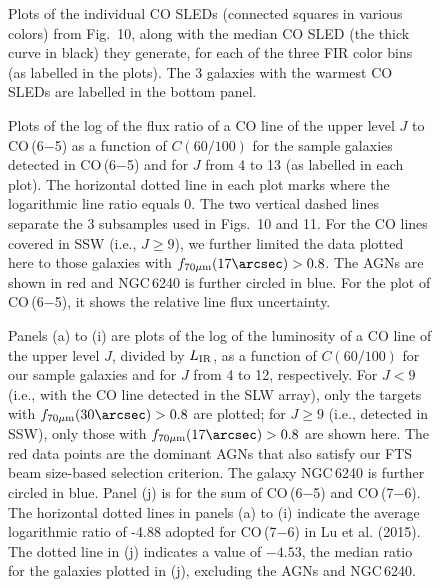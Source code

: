 \documentclass[preprint]{aastex}
\newcommand{\LIR}{\mbox{$L_{\rm IR}$}}
\begin{document}
\begin{figure}
\centering
\caption{
Plots of the individual CO SLEDs (connected squares in various colors) from Fig.~10, along 
with the median CO SLED (the thick curve in black) they generate, for each of the three 
FIR color bins (as labelled in the plots).  The 3 galaxies with the warmest CO SLEDs are 
labelled in the bottom panel.
}
\label{Fig11}
\end{figure}
\clearpage



\begin{figure}
\centering
{}
\caption{
Plots of the log of the flux ratio of a CO line of the upper level $J$ to CO\,(6$-$5) as a function
of $C(60/100)$ for the sample galaxies detected in CO\,(6$-$5) and for $J$ from 4 to 13 (as labelled 
in each plot).   The horizontal dotted line in each plot marks where the logarithmic line 
ratio equals 0. The two vertical dashed lines separate the 3 subsamples used in Figs.~10 and
11.  For the CO lines covered in SSW (i.e., $J \geqslant 9$), we further limited the data 
plotted here to those galaxies with $f_{70\mu{\rm m}}(17\arcsec) > 0.8$.  The AGNs are 
shown in red and NGC\,6240 is further circled in blue. For the plot of CO\,(6$-$5), it shows 
the relative line flux uncertainty.
}
\label{Fig12}
\end{figure}
\clearpage



\begin{figure}
\centering
{}
\caption{
Panels (a) to (i) are plots of the log of the luminosity of a CO line of the upper level $J$, 
divided by \LIR, as a function of $C(60/100)$ for our sample galaxies and for $J$ from 4 to
12, respectively.  For $J < 9$ (i.e., with the CO line detected in the SLW array), 
only the targets  with $f_{70\mu{\rm m}}(30\arcsec) > 0.8$ are plotted; for $J \geqslant 9$ 
(i.e., detected in SSW), only those with $f_{70\mu{\rm m}}(17\arcsec) > 0.8$ are shown here. 
The red data points are the dominant AGNs that also satisfy our FTS beam size-based selection
criterion.  The galaxy NGC\,6240 is further circled in blue.  Panel (j) is for the sum of 
CO\,(6$-$5) and CO\,(7$-$6).  The horizontal dotted lines in panels (a) to (i) indicate 
the average logarithmic ratio of -4.88 adopted for CO\,(7$-$6) in Lu et al. (2015). 
The dotted line in (j) indicates a value of $-4.53$, the median ratio for the galaxies plotted
in (j), excluding the AGNs and NGC\,6240.
}
\label{Fig13}
\end{figure}
\clearpage
\end{document}
